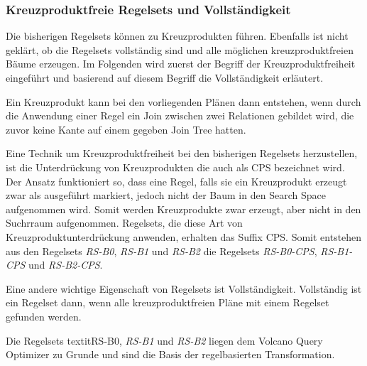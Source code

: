 \subsubsection{Kreuzproduktfreie Regelsets und Vollständigkeit}

Die bisherigen Regelsets können zu Kreuzprodukten führen. Ebenfalls ist nicht geklärt, ob die Regelsets vollständig sind und alle möglichen kreuzproduktfreien Bäume erzeugen. Im Folgenden wird zuerst der Begriff der Kreuzproduktfreiheit eingeführt und basierend auf diesem Begriff die Vollständigkeit erläutert.

Ein Kreuzprodukt kann bei den vorliegenden Plänen dann entstehen, wenn durch die Anwendung einer Regel ein Join zwischen zwei Relationen gebildet wird, die zuvor keine Kante auf einem gegeben Join Tree hatten.

Eine Technik um Kreuzproduktfreiheit bei den bisherigen Regelsets herzustellen, ist die Unterdrückung von Kreuzprodukten die auch als \ac{CPS} bezeichnet wird. Der Ansatz funktioniert so, dass eine Regel, falls sie ein Kreuzprodukt erzeugt zwar als ausgeführt markiert, jedoch nicht der Baum in den Search Space aufgenommen wird. Somit werden Kreuzprodukte zwar erzeugt, aber nicht in den Suchrraum aufgenommen. Regelsets, die diese Art von Kreuzproduktunterdrückung anwenden, erhalten das Suffix CPS. Somit entstehen aus den Regelsets \textit{RS-B0}, \textit{RS-B1} und \textit{RS-B2} die Regelsets \textit{RS-B0-CPS}, \textit{RS-B1-CPS} und \textit{RS-B2-CPS}.


Eine andere wichtige Eigenschaft von Regelsets ist Vollständigkeit. Vollständig ist ein Regelset dann, wenn alle kreuzproduktfreien Pläne mit einem Regelset gefunden werden.


Die Regelsets textit{RS-B0}, \textit{RS-B1} und \textit{RS-B2} liegen dem Volcano Query Optimizer zu Grunde und sind die Basis der regelbasierten Transformation.


